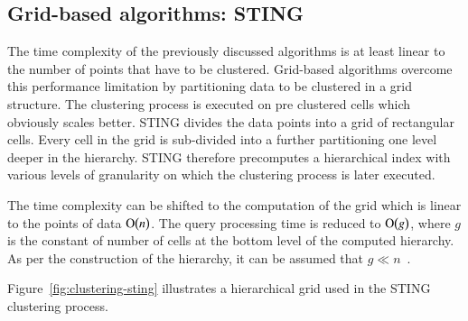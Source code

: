 \subsection{Grid-based algorithms: STING}

The time complexity of the previously discussed algorithms is at least linear to the number of points that have to be clustered. Grid-based algorithms overcome this performance limitation by partitioning data to be clustered in a grid structure. The clustering process is executed on pre clustered cells which obviously scales better. STING divides the data points into a grid of rectangular cells. Every cell in the grid is sub-divided into a further partitioning one level deeper in the hierarchy. STING therefore precomputes a hierarchical index with various levels of granularity on which the clustering process is later executed.

The time complexity can be shifted to the computation of the grid which is linear to the points of data $\operatorname{O}\bigl(n\bigr)$. The query processing time is reduced to $\operatorname{O}\bigl(g\bigr)$, where $g$ is the constant of number of cells at the bottom level of the computed hierarchy. As per the construction of the hierarchy, it can be assumed that $g \ll n$~\cite{Varlaro08spatial, Wang97sting}.  

Figure~\ref{fig:clustering-sting} illustrates a hierarchical grid used in the STING clustering process.

